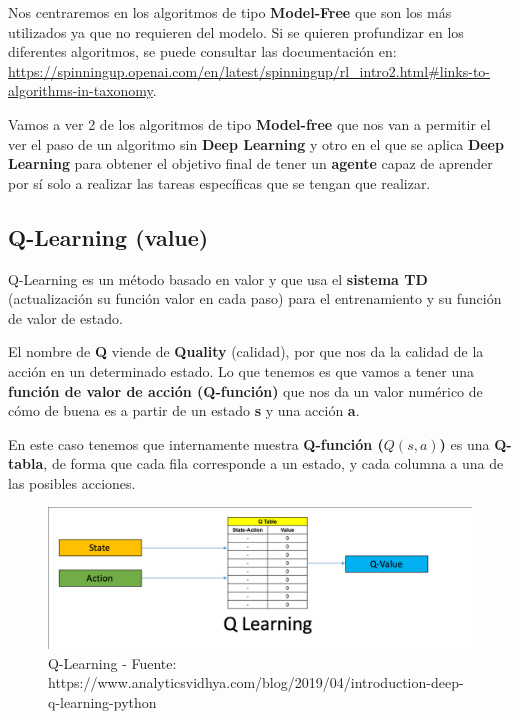 \documentclass[
  a4paper,
  DIV=11,
  numbers=noendperiod]{scrreprt}
\begin{document}
Nos centraremos en los algoritmos de tipo \textbf{Model-Free} que son
los más utilizados ya que no requieren del modelo. Si se quieren
profundizar en los diferentes algoritmos, se puede consultar las
documentación en:
\url{https://spinningup.openai.com/en/latest/spinningup/rl_intro2.html\#links-to-algorithms-in-taxonomy}.

Vamos a ver 2 de los algoritmos de tipo \textbf{Model-free} que nos van
a permitir el ver el paso de un algoritmo sin \textbf{Deep Learning} y
otro en el que se aplica \textbf{Deep Learning} para obtener el objetivo
final de tener un \textbf{agente} capaz de aprender por sí solo a
realizar las tareas específicas que se tengan que realizar.

\subsection{Q-Learning (value)}\label{q-learning-value}

Q-Learning es un método basado en valor y que usa el \textbf{sistema TD}
(actualización su función valor en cada paso) para el entrenamiento y su
función de valor de estado.

El nombre de \textbf{Q} viende de \textbf{Quality} (calidad), por que
nos da la calidad de la acción en un determinado estado. Lo que tenemos
es que vamos a tener una \textbf{función de valor de acción (Q-función)}
que nos da un valor numérico de cómo de buena es a partir de un estado
\textbf{s} y una acción \textbf{a}.

En este caso tenemos que internamente nuestra \textbf{Q-función
(}\(Q(s,a)\)\textbf{)} es una \textbf{Q-tabla}, de forma que cada fila
corresponde a un estado, y cada columna a una de las posibles acciones.

\begin{figure}[H]

{\centering \includegraphics{imagenes/capitulo1/rl_qlearning.png}

}

\caption{Q-Learning - Fuente:
https://www.analyticsvidhya.com/blog/2019/04/introduction-deep-q-learning-python}

\end{figure}%
\end{document}
